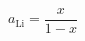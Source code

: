 \documentclass[preview]{standalone}
\begin{document}
\[a_\text{Li} = \frac{x}{1-x} \tag{1.10}\]
\end{document}
